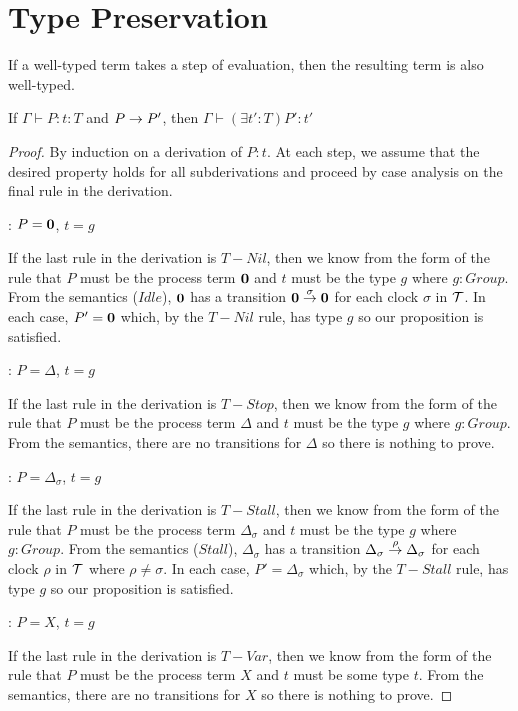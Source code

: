 \chapter{Type Preservation}

If a well-typed term takes a step of evaluation, then the resulting
term is also well-typed.

\begin{theorem}
If $\Gamma \vdash P : t : T$ and $P \stackrel{}{\rightarrow} P'$, then $\Gamma \vdash (\exists t' : T) P' : t'$
\end{theorem}

\begin{proof}
By induction on a derivation of $P:t$.  At each step, we assume that
the desired property holds for all subderivations and proceed by case
analysis on the final rule in the derivation.

: $P = \textbf{0}$, $t = g$

\noindent If the last rule in the derivation is $T-Nil$, then we know
from the form of the rule that $P$ must be the process term $\textbf{0}$ and
$t$ must be the type $g$ where $g : Group$.  From the semantics
($Idle$), $\textbf{0}$ has a transition $\textbf{0} \stackrel{\sigma}{\rightarrow} \textbf{0}$ for
each clock $\sigma$ in $\text{$\mathcal{T}$}$.  In each case, $P' = \textbf{0}$ which, by
the $T-Nil$ rule, has type $g$ so our proposition is satisfied.

: $P = \Delta$, $t = g$

\noindent If the last rule in the derivation is $T-Stop$, then we know
from the form of the rule that $P$ must be the process term $\Delta$
and $t$ must be the type $g$ where $g : Group$.  From the semantics,
there are no transitions for $\Delta$ so there is nothing to prove.

: $P = \Delta_\sigma$, $t = g$

\noindent If the last rule in the derivation is $T-Stall$, then we know
from the form of the rule that $P$ must be the process term
$\Delta_\sigma$ and $t$ must be the type $g$ where $g : Group$.  From
the semantics ($Stall$), $\Delta_\sigma$ has a transition
$\Delta_\sigma \stackrel{\rho}{\rightarrow} \Delta_\sigma$ for each clock $\rho$ in
$\text{$\mathcal{T}$}$ where $\rho \ne \sigma$.  In each case, $P' = \Delta_\sigma$
which, by the $T-Stall$ rule, has type $g$ so our proposition is
satisfied.

: $P = X$, $t = g$

\noindent If the last rule in the derivation is $T-Var$, then we know
from the form of the rule that $P$ must be the process term $X$ and
$t$ must be some type $t$.  From the semantics, there are no
transitions for $X$ so there is nothing to prove.


\end{proof}
